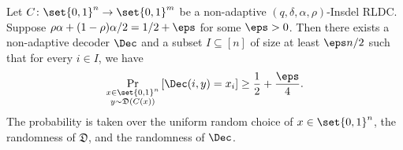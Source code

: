 \begin{lemma} \label{lem:reduce-to-ILDC}
Let $C \colon \set{0,1}^n \rightarrow \set{0,1}^m$ be a non-adaptive $(q,\delta,\alpha,\rho)$-Insdel RLDC. Suppose $\rho\alpha + (1-\rho)\alpha/2 = 1/2+\eps$ for some $\eps > 0$. Then there exists a non-adaptive decoder $\Dec$ and a subset $I \subseteq [n]$ of size at least $\eps n/2$ such that for every $i \in I$, we have 
\begin{align*}
	\Pr_{\substack{x \in \set{0,1}^n \\ y \sim \mathfrak{D}(C(x))}}\left[ \Dec(i, y) = x_i \right] \ge \frac{1}{2} + \frac{\eps}{4}.
\end{align*}
The probability is taken over the uniform random choice of $x \in \set{0,1}^n$, the randomness of $\mathfrak{D}$, and the randomness of $\Dec$.
\end{lemma}
